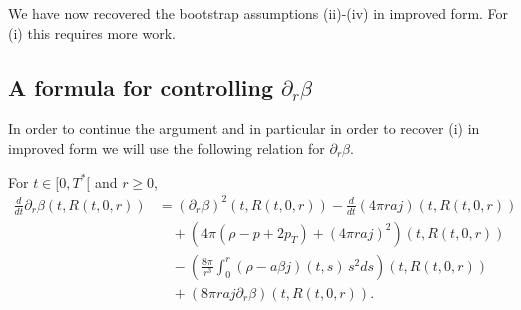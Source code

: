 \documentclass[11pt]{article}
\begin{document}
We have now recovered the bootstrap assumptions (ii)-(iv) in improved form. For
(i) this requires more work.
%
%
\subsection{A formula for controlling $\partial_r\beta$}
%
%
In order to continue the argument and in particular in order to
recover (i) in improved form we will use the following relation
for $\partial_r\beta$.
%
\begin{lemma}\label{betarepchar}
  For $t\in [0,T^\ast[$ and $r\geq 0$,
  \begin{align*}
    \frac{d}{dt} \partial_r \beta(t,R(t,0,r))
    & = (\partial_r\beta)^2(t,R(t,0,r))
    - \frac{d}{dt}(4\pi r a j)(t,R(t,0,r)) \\
    & \quad
    {}+\left( 4 \pi (\rho - p + 2 p_T) + (4 \pi r a j)^2\right)(t,R(t,0,r))\\
    & \quad
    {} - \left(\frac{8\pi}{r^3}
    \int_0^r (\rho - a \beta j)(t,s)\, s^2 ds\right)(t,R(t,0,r))\\
    & \quad
    {}+\left(8\pi r a j \partial_r\beta\right)(t,R(t,0,r)) .
  \end{align*}
\end{lemma}
%
\end{document}
